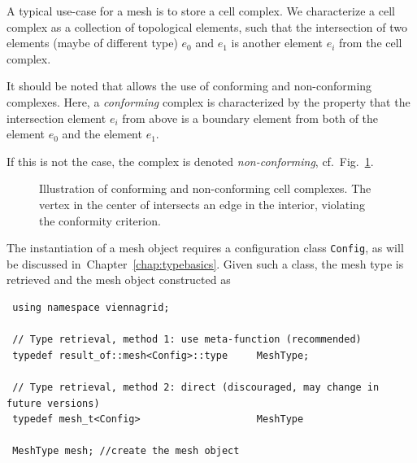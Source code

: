 A typical use-case for a mesh is to store a cell complex. We characterize a cell complex as a collection of topological elements, such that the intersection of two elements (maybe of different type) $e_0$ and $e_1$  is another element $e_i$ from the cell complex.

It should be noted that {\ViennaGrid} allows the use of conforming and non-conforming complexes. Here, a \emph{conforming} complex is characterized by the property that the intersection element $e_i$  from above is a boundary element from both of the element $e_0$ and the element $e_1$.

If this is not the case, the complex is denoted \emph{non-conforming}, cf.~Fig.~\ref{fig:conformity}.

\begin{figure}[tb]
\centering
    \hspace*{2cm}
 \caption{Illustration of conforming and non-conforming cell complexes. The vertex in the center of  intersects an edge in the interior, violating the conformity criterion.}
 \label{fig:conformity}
\end{figure}

\pagebreak

The instantiation of a {\ViennaGrid} mesh object requires a configuration class \lstinline|Config|, as will be discussed in~Chapter~\ref{chap:typebasics}. Given such a class, the mesh type is retrieved and the mesh object constructed as
\begin{lstlisting}
 using namespace viennagrid;

 // Type retrieval, method 1: use meta-function (recommended)
 typedef result_of::mesh<Config>::type     MeshType;

 // Type retrieval, method 2: direct (discouraged, may change in future versions)
 typedef mesh_t<Config>                    MeshType

 MeshType mesh; //create the mesh object
\end{lstlisting}


